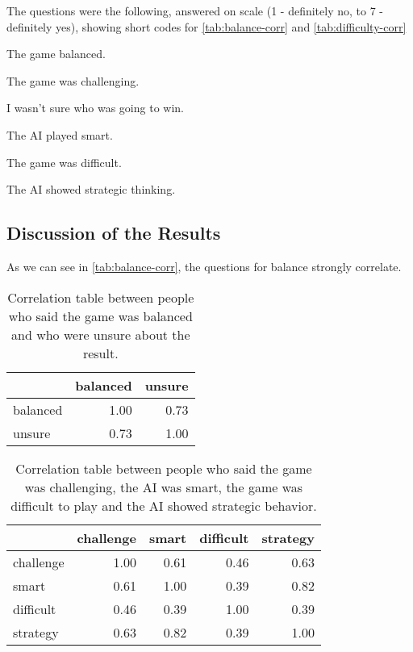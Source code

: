 The questions were the following, answered on scale (1 - definitely no, to 7 - definitely yes), showing short codes for \autoref{tab:balance-corr} and \autoref{tab:difficulty-corr}

\begin{description}[]
	\item[Balanced:] The game balanced.
	\item[Challenge:] The game was challenging.
	\item[Unsure:] I wasn't sure who was going to win.
	\item[Smart:] The AI played smart.
	\item[Difficult:] The game was difficult.
	\item[Strategy:] The AI showed strategic thinking.
\end{description}

\subsection{Discussion of the Results}

As we can see in \autoref{tab:balance-corr}, the questions for balance strongly correlate.

\begin{table}[h]
	\centering
	\begin{tabular}{lrr}
		\toprule
		{} &  balanced &  unsure \\
		\midrule
		balanced &      1.00 &    \cellcolor{blue!25}0.73 \\
		unsure   &      0.73 &    1.00 \\
		\bottomrule
	\end{tabular}
	\caption{Correlation table between people who said the game was balanced and who were unsure about the result.}	
	\label{tab:balance-corr}
\end{table}

\begin{table}[h]
	\centering
	\begin{tabular}{lrrrr}
		\toprule
		{} &  challenge &  smart &  difficult &  strategy \\
		\midrule
		challenge &       1.00 &   0.61 &       0.46 &      0.63 \\
		smart     &       0.61 &   1.00 &       0.39 &      \cellcolor{blue!25}0.82 \\
		difficult &       0.46 &   0.39 &       1.00 &      0.39 \\
		strategy  &       0.63 &   0.82 &       0.39 &      1.00 \\
		\bottomrule
	\end{tabular}
	\caption{Correlation table between people who said the game was challenging, the AI was smart, the game was difficult to play and the AI showed strategic behavior.}
	\label{tab:difficulty-corr}
\end{table}


